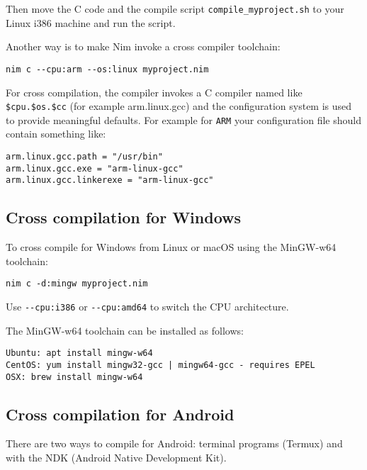 Then move the C code and the compile script
\texttt{compile\_myproject.sh} to your Linux i386 machine and run the
script.

Another way is to make Nim invoke a cross compiler toolchain:

\begin{verbatim}
nim c --cpu:arm --os:linux myproject.nim
\end{verbatim}

For cross compilation, the compiler invokes a C compiler named like
\texttt{\$cpu.\$os.\$cc} (for example arm.linux.gcc) and the
configuration system is used to provide meaningful defaults. For example
for \texttt{ARM} your configuration file should contain something like:

\begin{verbatim}
arm.linux.gcc.path = "/usr/bin"
arm.linux.gcc.exe = "arm-linux-gcc"
arm.linux.gcc.linkerexe = "arm-linux-gcc"
\end{verbatim}

\hypertarget{cross-compilation-for-windows}{%
\subsection{Cross compilation for
Windows}\label{cross-compilation-for-windows}}

To cross compile for Windows from Linux or macOS using the MinGW-w64
toolchain:

\begin{verbatim}
nim c -d:mingw myproject.nim
\end{verbatim}

Use \texttt{-\/-cpu:i386} or \texttt{-\/-cpu:amd64} to switch the CPU
architecture.

The MinGW-w64 toolchain can be installed as follows:

\begin{verbatim}
Ubuntu: apt install mingw-w64
CentOS: yum install mingw32-gcc | mingw64-gcc - requires EPEL
OSX: brew install mingw-w64
\end{verbatim}

\hypertarget{cross-compilation-for-android}{%
\subsection{Cross compilation for
Android}\label{cross-compilation-for-android}}

There are two ways to compile for Android: terminal programs (Termux)
and with the NDK (Android Native Development Kit).

